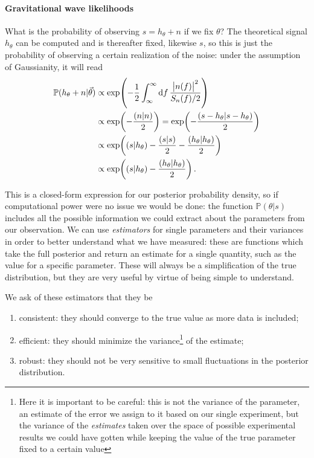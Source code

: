 \documentclass[main.tex]{subfiles}
\begin{document}
\paragraph{Gravitational wave likelihoods}

What is the probability of observing \(s = h_\theta + n\) if we fix \(\theta \)? The theoretical signal \(h_\theta \) can be computed and is thereafter fixed, likewise \(s\), so this is just the probability of observing a certain realization of the noise: under the assumption of Gaussianity, it will read 
%
\begin{align}
\mathbb{P}(h_\theta + n | \vec{\theta})  
&\propto \exp( - \frac{1}{2} \int_{\infty }^{\infty } \dd{f} \frac{\abs{n(f)}^2}{S_n(f) / 2} )
\\
&\propto 
\exp(- \frac{(n|n)}{2}) 
= \exp( - \frac{(s-h_\theta | s-h_\theta )}{2} )  \\
&\propto \exp(
     (s | h_\theta ) 
     - \frac{(s|s)}{2} 
     - \frac{(h_\theta |h_\theta )}{2}
     )  \\
&\propto \exp( (s | h_\theta ) - 
\frac{(h_\theta | h_\theta )}{2})
\,.
\end{align}

This is a closed-form expression for our posterior probability density, so if computational power were no issue we would be done: the function \(\mathbb{P}(\theta | s)\) includes all the possible information we could extract about the parameters from our observation. 
We can use \emph{estimators} for single parameters and their variances in order to better understand what we have measured: these are functions which take the full posterior and return an estimate for a single quantity, such as the value for a specific parameter.
These will always be a simplification of the true distribution, but they are very useful by virtue of being simple to understand.

We ask of these estimators that they be 
\begin{enumerate}
    \item consistent: they should converge to the true value as more data is included;
    \item efficient: they should minimize the variance\footnote{Here it is important to be careful: this is not the variance of the parameter, an estimate of the error we assign to it based on our single experiment, but the variance of the \emph{estimates} taken over the space of possible experimental results we could have gotten while keeping the value of the true parameter fixed to a certain value} of the estimate;
    \item robust: they should not be very sensitive to small fluctuations in the posterior distribution.
\end{enumerate}
\end{document}
